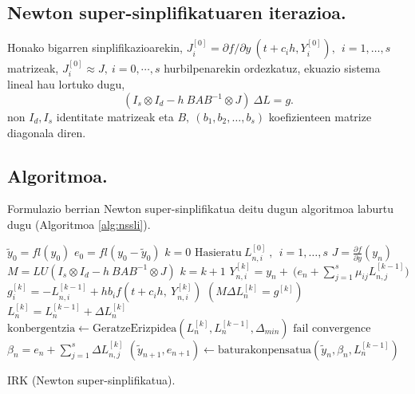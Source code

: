 \subsection*{Newton super-sinplifikatuaren iterazioa.}

Honako bigarren sinplifikazioarekin, $J_i^{[0]}=\partial f / \partial y \ (t+c_ih, Y_i^{[0]}), \ \  i=1,\dots,s$ matrizeak,  $J_i^{[0]} \approx J, \ i=0,\cdots,s$ hurbilpenarekin ordezkatuz, ekuazio sistema lineal hau lortuko dugu,
\begin{equation}
\label{eq:nsseq2}
(I_s \otimes I_d - h \ BAB^{-1} \otimes J) \ \Delta L = g. 
\end{equation}
non $I_d, I_s$ identitate matrizeak eta $B, \ (b_1,b_2,\dots,b_s)$ koefizienteen matrize diagonala diren.  

\subsection*{Algoritmoa.}

Formulazio berrian Newton super-sinplifikatua deitu dugun algoritmoa laburtu dugu (Algoritmoa \ref{alg:nssli}).

\begin{algorithm}[H]
 \BlankLine
  $\tilde{y}_0=fl(y_0)$\;
  $e_0=fl(y_0-\tilde{y}_0)$\;
  {
   \BlankLine
   $k=0$\;
   $\text{Hasieratu} \ L_{n,i}^{[0]} \ , \ \ i=1,\dots,s $\;
   \BlankLine
   $J=\frac{\partial f}{\partial y}(y_n) $\; 
   $M=LU(I_s \otimes I_d - h \ BAB^{-1} \otimes J)$\;
   \BlankLine
   {
    \BlankLine 
    $k=k+1$\;
    $Y_{n,i}^{[k]}=y_{n} + \ \big(e_n+\sum\limits_{j=1}^{s} \mu_{ij} L_{n,j}^{[k-1]}\big)  $\;
    $g_i^{[k]}=-L_{n,i}^{[k-1]}+h b_i f(t+c_ih,\ Y_{n,i}^{[k]})$\;
     $(M \Delta L_n^{[k]}=g^{[k]})$\;
    $L_n^{[k]}=L_n^{[k-1]}+\Delta L_n^{[k]}$\;
    $\text{konbergentzia} \leftarrow \text{GeratzeErizpidea}(L_n^{[k]},L_n^{[k-1]},\Delta_{min}) $\;
   }
   \BlankLine
   {
    {$\text{fail convergence}$\;}
   }
   $\beta_{n}={e}_{n} + \sum\limits_{j=1}^{s}\Delta L_{n,j}^{[k]}$\;
   $(\tilde y_{n+1}, e_{n+1})\leftarrow \text{baturakonpensatua}(\tilde y_{n},\beta_{n},L_{n}^{[k-1]})$\;
 }
 \caption{IRK (Newton super-sinplifikatua).}
 \label{alg:nssli}
\end{algorithm}


